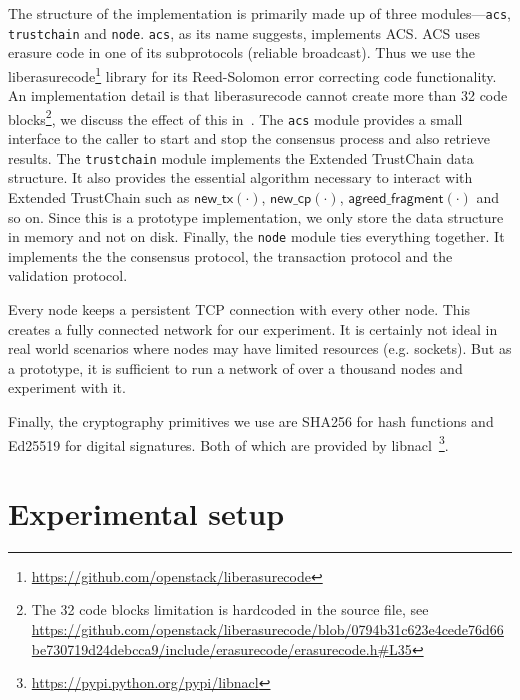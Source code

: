 The structure of the implementation is primarily made up of three modules---\texttt{acs}, \texttt{trustchain} and \texttt{node}.
\texttt{acs}, as its name suggests, implements ACS.
ACS uses erasure code in one of its subprotocols (reliable broadcast).
Thus we use the liberasurecode\footnote{\url{https://github.com/openstack/liberasurecode}} library for its Reed-Solomon error correcting code functionality.
An implementation detail is that liberasurecode cannot create more than 32 code blocks\footnote{
  The 32 code blocks limitation is hardcoded in the source file, see
  \url{https://github.com/openstack/liberasurecode/blob/0794b31c623e4cede76d66be730719d24debcca9/include/erasurecode/erasurecode.h\#L35}
}, we discuss the effect of this in~.
The \texttt{acs} module provides a small interface to the caller to start and stop the consensus process and also retrieve results.
The \texttt{trustchain} module implements the Extended TrustChain data structure.
It also provides the essential algorithm necessary to interact with Extended TrustChain such as 
$\textsf{new\_tx}(\cdot)$, $\textsf{new\_cp}(\cdot)$, $\textsf{agreed\_fragment}(\cdot)$ and so on.
Since this is a prototype implementation, we only store the data structure in memory and not on disk.
Finally, the \texttt{node} module ties everything together.
It implements the the consensus protocol, the transaction protocol and the validation protocol.


Every node keeps a persistent TCP connection with every other node.
This creates a fully connected network for our experiment.
It is certainly not ideal in real world scenarios where nodes may have limited resources (e.g. sockets).
But as a prototype, it is sufficient to run a network of over a thousand nodes and experiment with it.

Finally, the cryptography primitives we use are SHA256 for hash functions and Ed25519 for digital signatures.
Both of which are provided by libnacl~\footnote{\url{https://pypi.python.org/pypi/libnacl}}.


\section{Experimental setup}
\label{sec:experimental-setup}

